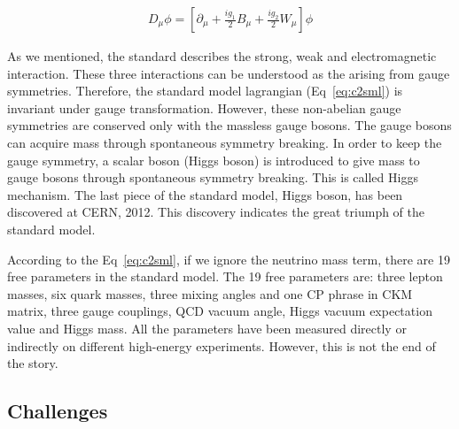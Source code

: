 \begin{equation}
 \begin{aligned}
  D_{\mu}\phi = [\partial_{\mu}+\frac{ig_{1}}{2}B_{\mu}+\frac{ig_{2}}{2}W_{\mu}]\phi
 \end{aligned}
 \label{eq:c2smldh}
\end{equation}

As we mentioned, the standard describes the strong, weak and electromagnetic interaction. These three interactions can be understood as the arising from gauge symmetries\cite{PhysRev.96.191}. Therefore, the standard model lagrangian (Eq~\ref{eq:c2sml}) is invariant under gauge transformation. However, these non-abelian gauge symmetries are conserved only with the massless gauge bosons. The gauge bosons can acquire mass through spontaneous symmetry breaking\cite{PhysRevLett.4.380,PhysRev.122.345,PhysRev.124.246}. In order to keep the gauge symmetry, a scalar boson (Higgs boson) is introduced to give mass to gauge bosons through spontaneous symmetry breaking. This is called Higgs mechanism\cite{PhysRevLett.13.321,PhysRevLett.13.508}. The last piece of the standard model, Higgs boson, has been discovered at CERN, 2012\cite{Aad:2012tfa,Chatrchyan:2012xdj}. This discovery indicates the great triumph of the standard model\cite{Weinberg:2004kv}.

According to the Eq~\ref{eq:c2sml}, if we ignore the neutrino mass term, there are 19 free parameters in the standard model. The 19 free parameters are: three lepton masses, six quark masses, three mixing angles and one CP phrase in CKM matrix\cite{PhysRevLett.10.531,Kobayashi:1973fv}, three gauge couplings, QCD vacuum angle, Higgs vacuum expectation value and Higgs mass. All the parameters have been measured directly or indirectly on different high-energy experiments. However, this is not the end of the story. 

\clearpage
\subsection{Challenges}

